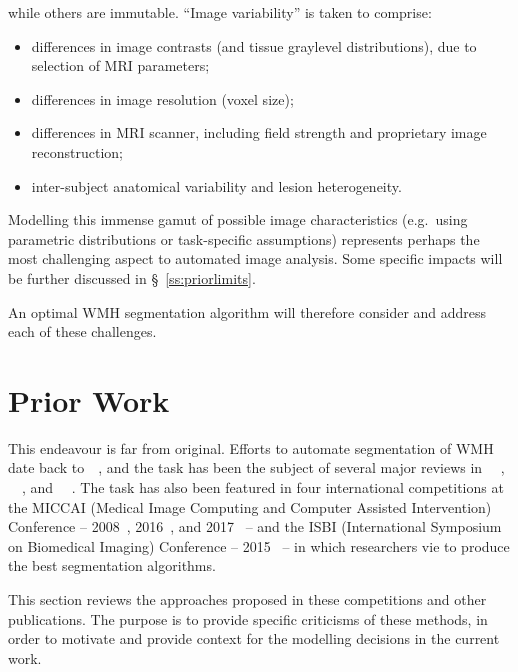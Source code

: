 \begin{enumerate}[itemsep=0pt,topsep=0pt]
    while others are immutable.
    ``Image variability'' is taken to comprise:
    \begin{itemize}[itemsep=0pt,topsep=0pt]
      \item differences in image contrasts (and tissue graylevel distributions),
      due to selection of MRI parameters;
      \item differences in image resolution (voxel size);
      \item differences in MRI scanner, including
      field strength and proprietary image reconstruction;
      \item inter-subject anatomical variability and lesion heterogeneity.
    \end{itemize}
    Modelling this immense gamut of possible image characteristics
    (e.g.\ using parametric distributions or task-specific assumptions)
    represents perhaps the most challenging aspect to automated image analysis.
    Some specific impacts will be further discussed in \S~\ref{ss:priorlimits}.
\end{enumerate}
An optimal WMH segmentation algorithm will therefore consider and address each of these challenges.
\section{Prior Work}\label{s:prior}
This endeavour is far from original.
Efforts to automate segmentation of WMH date back to~\citeyear{Kapouleas1990}~\cite{Kapouleas1990},
and the task has been the subject of several major reviews in%
~\citeyear{Llado2012}~\cite{Llado2012,Mortazavi2012},%
~\citeyear{Garcia-Lorenzo2013}~\cite{Garcia-Lorenzo2013}, and%
~\citeyear{Caligiuri2015}~\cite{Caligiuri2015}.
The task has also been featured in four international competitions at the
MICCAI (Medical Image Computing and Computer Assisted Intervention) Conference --
2008~\cite{MSSEG2008}, 2016~\cite{MSSEG2016}, and 2017~\cite{WMHSEG2017} --
and the
ISBI (International Symposium on Biomedical Imaging) Conference --
2015~\cite{MSISBI2015} --
in which researchers vie to produce the best segmentation algorithms.
\par
This section reviews the approaches proposed in these competitions and other publications.
The purpose is to provide specific criticisms of these methods,
in order to motivate and provide context for the modelling decisions in the current work.
